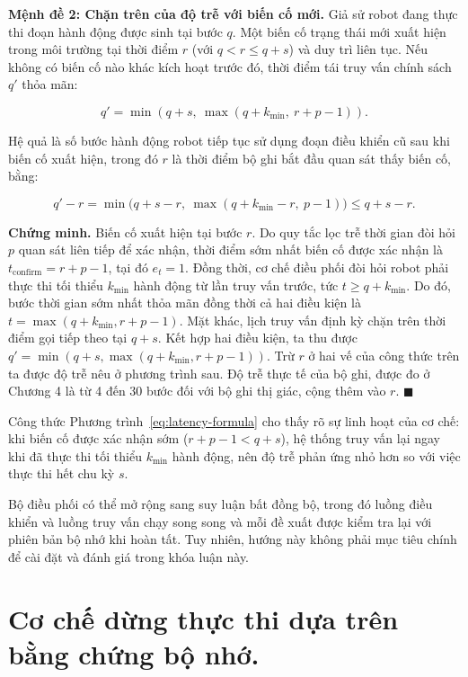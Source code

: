 \textbf{Mệnh đề 2: Chặn trên của độ trễ với biến cố mới.} Giả sử robot đang thực thi đoạn hành động được sinh tại bước $q$. Một biến cố trạng thái mới xuất hiện trong môi trường tại thời điểm $r$ (với $q < r \le q + s$) và duy trì liên tục. Nếu không có biến cố nào khác kích hoạt trước đó, thời điểm tái truy vấn chính sách $q'$ thỏa mãn:

\begin{equation}
q' = \min(q + s,\ \max(q + k_{\min},\ r + p - 1)).
\label{eq:latency-formula}
\end{equation}

Hệ quả là số bước hành động robot tiếp tục sử dụng đoạn điều khiển cũ sau khi biến cố xuất hiện, trong đó $r$ là thời điểm bộ ghi bắt đầu quan sát thấy biến cố, bằng:

\begin{equation}
q' - r = \min\!\big(q + s - r,\ \max(q + k_{\min} - r,\ p - 1)\big) \le q + s - r.
\label{eq:latency-bound}
\end{equation}

\textbf{Chứng minh.} Biến cố xuất hiện tại bước $r$. Do quy tắc lọc trễ thời gian đòi hỏi $p$ quan sát liên tiếp để xác nhận, thời điểm sớm nhất biến cố được xác nhận là $t_{\mathrm{confirm}} = r + p - 1$, tại đó $e_t = 1$. Đồng thời, cơ chế điều phối đòi hỏi robot phải thực thi tối thiểu $k_{\min}$ hành động từ lần truy vấn trước, tức $t \ge q + k_{\min}$. Do đó, bước thời gian sớm nhất thỏa mãn đồng thời cả hai điều kiện là $t = \max(q + k_{\min}, r + p - 1)$. Mặt khác, lịch truy vấn định kỳ chặn trên thời điểm gọi tiếp theo tại $q + s$. Kết hợp hai điều kiện, ta thu được $q' = \min(q + s, \max(q + k_{\min}, r + p - 1))$. Trừ $r$ ở hai vế của công thức trên ta được độ trễ nêu ở phương trình sau. Độ trễ thực tế của bộ ghi, được đo ở Chương 4 là từ 4 đến 30 bước đối với bộ ghi thị giác, cộng thêm vào $r$. $\blacksquare$

Công thức Phương trình~\eqref{eq:latency-formula} cho thấy rõ sự linh hoạt của cơ chế: khi biến cố được xác nhận sớm ($r + p - 1 < q + s$), hệ thống truy vấn lại ngay khi đã thực thi tối thiểu $k_{\min}$ hành động, nên độ trễ phản ứng nhỏ hơn so với việc thực thi hết chu kỳ $s$.

Bộ điều phối có thể mở rộng sang suy luận bất đồng bộ, trong đó luồng điều khiển và luồng truy vấn chạy song song và mỗi đề xuất được kiểm tra lại với phiên bản bộ nhớ khi hoàn tất. Tuy nhiên, hướng này không phải mục tiêu chính để cài đặt và đánh giá trong khóa luận này.

\section{Cơ chế dừng thực thi dựa trên bằng chứng bộ nhớ.}
\label{sec:method-memory-halt}

